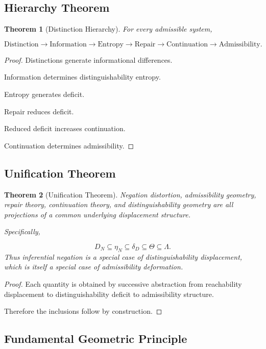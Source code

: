 \documentclass[12pt]{article}
\newtheorem{theorem}{Theorem}[section]
\theoremstyle{remark}
\begin{document}
\subsection{Hierarchy Theorem}

\begin{theorem}[Distinction Hierarchy]
For every admissible system,

\[
\text{Distinction}
\rightarrow
\text{Information}
\rightarrow
\text{Entropy}
\rightarrow
\text{Repair}
\rightarrow
\text{Continuation}
\rightarrow
\text{Admissibility}.
\]
\end{theorem}
\begin{proof}
Distinctions generate informational differences.

Information determines distinguishability entropy.

Entropy generates deficit.

Repair reduces deficit.

Reduced deficit increases continuation.

Continuation determines admissibility.
\end{proof}

\subsection{Unification Theorem}

\begin{theorem}[Unification Theorem]
Negation distortion, admissibility geometry, repair theory, continuation theory, and distinguishability geometry are all projections of a common underlying displacement structure.

Specifically,

\[
D_N
\subseteq
\eta_N
\subseteq
\delta_D
\subseteq
\Theta
\subseteq
\Lambda.
\]
Thus inferential negation is a special case of distinguishability displacement, which is itself a special case of admissibility deformation.
\end{theorem}

\begin{proof}
Each quantity is obtained by successive abstraction from reachability displacement to distinguishability deficit to admissibility structure.

Therefore the inclusions follow by construction.
\end{proof}

\subsection{Fundamental Geometric Principle}
\end{document}
